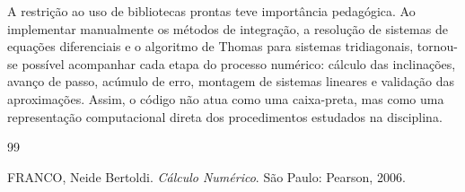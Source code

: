 \documentclass[a4paper,12pt]{article}
\begin{document}
A restrição ao uso de bibliotecas prontas teve importância pedagógica. Ao implementar manualmente os métodos de integração, a resolução de sistemas de equações diferenciais e o algoritmo de Thomas para sistemas tridiagonais, tornou-se possível acompanhar cada etapa do processo numérico: cálculo das inclinações, avanço de passo, acúmulo de erro, montagem de sistemas lineares e validação das aproximações. Assim, o código não atua como uma caixa-preta, mas como uma representação computacional direta dos procedimentos estudados na disciplina.

\newpage


\newpage
\begin{thebibliography}{99}

FRANCO, Neide Bertoldi. \emph{Cálculo Numérico}. São Paulo: Pearson, 2006.


\end{thebibliography}
\end{document}

